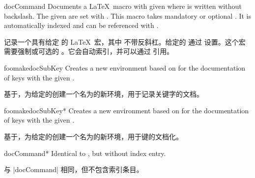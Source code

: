 \begin{docEnvironment}[doclang/environment content=command description,doc updated=2020-04-22]
  {docCommand}{}
Documents a \LaTeX\ macro with given  where  is
written without backslash. The given  are set with .
This macro takes mandatory or optional .
It is automatically indexed and can be referenced with
.

记录一个具有给定  的 \LaTeX\ 宏，其中  不带反斜杠。给定的  通过  设置。这个宏需要强制或可选的 。它会自动索引，并可以通过  引用。
\begin{dispExample}
\begin{docCommand}{foomakedocSubKey}{}
Creates a new environment  based on  for the
documentation of keys with the given .

基于，为给定的创建一个名为的新环境，用于记录关键字的文档。
\end{docCommand}
\end{dispExample}
\begin{dispExample}
\begin{docCommand}[color definition=blue]{foomakedocSubKey*}%
  {}
Creates a new environment  based on  for the
documentation of keys with the given .

基于，为给定的创建一个名为的新环境，用于键的文档化。
\end{docCommand}
\end{dispExample}
\end{docEnvironment}

\begin{docEnvironment}[doclang/environment content=command description,doc updated=2020-04-22]
  {docCommand*}{}
Identical to , but without index entry.

与 |docCommand| 相同，但不包含索引条目。
\end{docEnvironment}